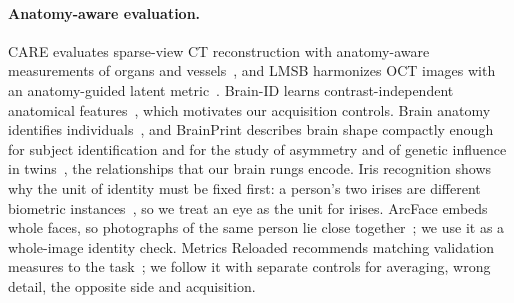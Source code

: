 \paragraph{Anatomy-aware evaluation.}
CARE evaluates sparse-view \ac{CT} reconstruction with anatomy-aware measurements of organs and vessels~\cite{care2025}, and LMSB harmonizes \ac{OCT} images with an anatomy-guided latent metric~\cite{lmsb2025}.
Brain-ID learns contrast-independent anatomical features~\cite{brainid2024}, which motivates our acquisition controls.
Brain anatomy identifies individuals~\cite{valizadeh2018}, and BrainPrint describes brain shape compactly enough for subject identification and for the study of asymmetry and of genetic influence in twins~\cite{wachinger2015brainprint}, the relationships that our brain rungs encode.
Iris recognition shows why the unit of identity must be fixed first: a person's two irises are different biometric instances~\cite{daugman2004,daugman2001}, so we treat an eye as the unit for irises.
ArcFace embeds whole faces, so photographs of the same person lie close together~\cite{arcface2022}; we use it as a whole-image identity check.
Metrics Reloaded recommends matching validation measures to the task~\cite{metrics2024}; we follow it with separate controls for averaging, wrong detail, the opposite side and acquisition.
